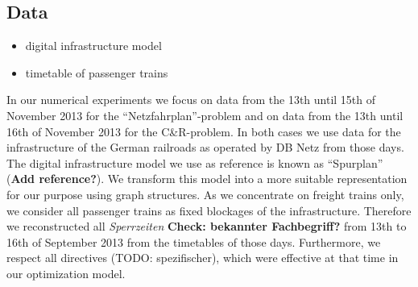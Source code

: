 \subsection{Data}
\begin{itemize}
  \item digital infrastructure model
  \item timetable of passenger trains
\end{itemize}
In our numerical experiments we focus on data from the 13th until 15th of November 2013 for the ``Netzfahrplan''-problem and on data from the 13th until 16th of November 2013 for the C\&R-problem. In both cases we use data for the infrastructure of the German railroads as operated by DB Netz from those days. The digital infrastructure model we use as reference is known as ``Spurplan'' (\textbf{Add reference?}). We transform this model into a more suitable representation for our purpose using graph structures. As we concentrate on freight trains only, we consider all passenger trains as fixed blockages of the infrastructure. Therefore we reconstructed all \textit{Sperrzeiten} \textbf{Check: bekannter Fachbegriff?} from 13th to 16th of September 2013 from the timetables of those days. Furthermore, we respect all directives (TODO: spezifischer), which were effective at that time in our optimization model.


